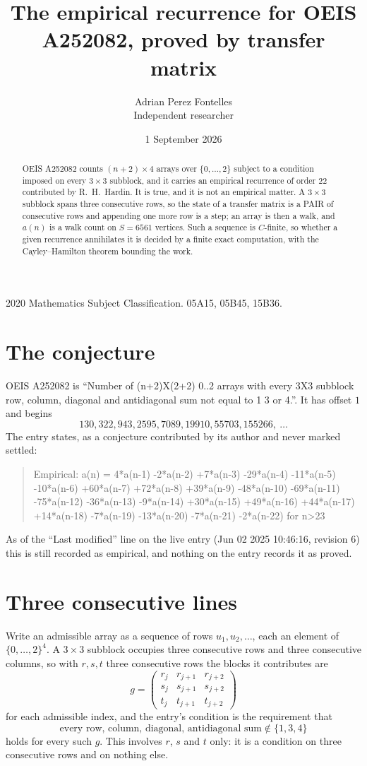 \documentclass[11pt,a4paper]{article}
\title{The empirical recurrence for OEIS A252082, proved by transfer matrix}
\author{Adrian Perez Fontelles\\ \small Independent researcher}
\date{1 September 2026}
\theoremstyle{plain}
\theoremstyle{definition}
\begin{document}
\maketitle

\begin{abstract}
OEIS A252082 counts $(n+2)\times4$ arrays over $\{0,\dots,2\}$ subject to a condition imposed on
every $3\times3$ subblock, and it carries an empirical recurrence of order $22$
contributed by R.~H.~Hardin. It is true, and it is not an empirical matter. A $3\times3$
subblock spans three consecutive rows, so the state of a transfer matrix is a PAIR of
consecutive rows and appending one more row is a step; an array is then a walk, and
$a(n)$ is a walk count on $S=6561$ vertices. Such a sequence is $C$-finite, so whether a given
recurrence annihilates it is decided by a finite exact computation, with the Cayley--Hamilton
theorem bounding the work.
\end{abstract}

\noindent\small 2020 Mathematics Subject Classification. 05A15, 05B45, 15B36.\normalsize

\section{The conjecture}

OEIS A252082 is ``Number of (n+2)X(2+2) 0..2 arrays with every 3X3 subblock row, column, diagonal and antidiagonal sum not equal to 1 3 or 4.''. It has offset $1$ and begins
\[
130, 322, 943, 2595, 7089, 19910, 55703, 155266,\ \dots
\]
The entry states, as a conjecture contributed by its author and never marked settled:
\begin{quote}
Empirical: a(n) = 4*a(n-1) -2*a(n-2) +7*a(n-3) -29*a(n-4) -11*a(n-5) -10*a(n-6) +60*a(n-7) +72*a(n-8) +39*a(n-9) -48*a(n-10) -69*a(n-11) -75*a(n-12) -36*a(n-13) -9*a(n-14) +30*a(n-15) +49*a(n-16) +44*a(n-17) +14*a(n-18) -7*a(n-19) -13*a(n-20) -7*a(n-21) -2*a(n-22) for n>23
\end{quote}
As of the ``Last modified'' line on the live entry (Jun 02 2025 10:46:16, revision 6) this is still
recorded as empirical, and nothing on the entry records it as proved.

\section{Three consecutive lines}

Write an admissible array as a sequence of rows $u_1,u_2,\dots$, each an element of
$\{0,\dots,2\}^{4}$. A $3\times3$ subblock occupies three consecutive rows and
three consecutive columns, so with $r,s,t$ three consecutive rows the blocks it
contributes are
\[
g=\begin{pmatrix}r_j&r_{j+1}&r_{j+2}\\ s_j&s_{j+1}&s_{j+2}\\ t_j&t_{j+1}&t_{j+2}\end{pmatrix}
\]
for each admissible index, and the entry's condition is the requirement that
\[
\text{every row, column, diagonal, antidiagonal sum} \notin \{1,3,4\}
\]
holds for every such $g$. This involves $r$, $s$ and $t$ only: it is a condition on
three consecutive rows and on nothing else.
\end{document}
